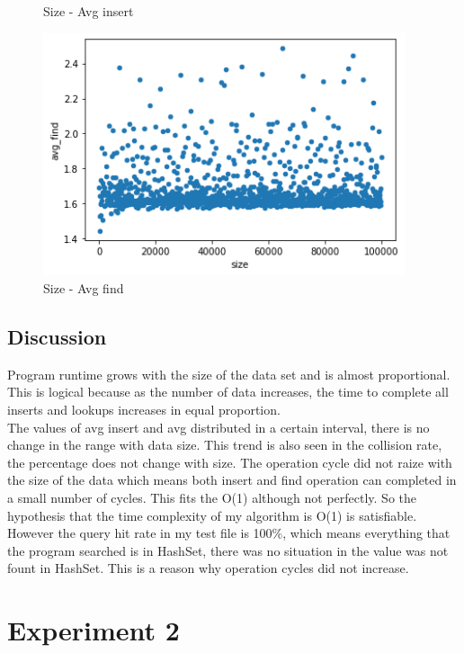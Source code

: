 \documentclass[a4]{article}
\begin{document}
\begin{figure}[H]
\begin{minipage}{0.48\textwidth}
    \caption{Size - Avg insert}
    \end{minipage}
    \begin{minipage}{0.48\textwidth}
    \includegraphics[width=0.95\textwidth]{h-size-find.png}
    \caption{Size - Avg find}
    \end{minipage}
\end{figure}

\subsection{Discussion}

Program runtime grows with the size of the data set and is almost proportional. This is logical because as the number of data increases, the time to complete all inserts and lookups increases in equal proportion.\\

\noindent The values of avg insert and avg distributed in a certain interval, there is no change in the range with data size. This trend is also seen in the collision rate, the percentage does not change with size. The operation cycle did not raize with the size of the data which means both insert and find operation can completed in a small number of cycles. This fits the O(1) although not perfectly. So the hypothesis that the time complexity of my algorithm is O(1) is satisfiable.\\

\noindent However the query hit rate in my test file is 100\%, which means everything that the program searched is in HashSet, there was no situation in the value was not fount in HashSet. This is a reason why operation cycles did not increase.


\section{Experiment 2}
\end{document}
